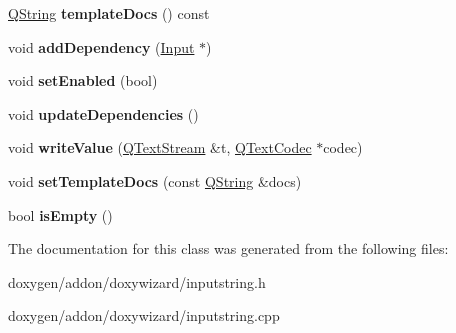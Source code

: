 \begin{DoxyCompactItemize}
\mbox{\hyperlink{class_q_string}{Q\+String}} {\bfseries template\+Docs} () const
\item 
\mbox{\label{class_input_string_a46b5ce5badcf1c6df3a891810cb91e41}} 
void {\bfseries add\+Dependency} (\mbox{\hyperlink{class_input}{Input}} $\ast$)
\item 
\mbox{\label{class_input_string_add9620f611a4e69090232a7b15c7e74e}} 
void {\bfseries set\+Enabled} (bool)
\item 
\mbox{\label{class_input_string_afc5b4853b2226058f4b996c114967f81}} 
void {\bfseries update\+Dependencies} ()
\item 
\mbox{\label{class_input_string_ae515cffbe50507d2c97ffa3ea36cade0}} 
void {\bfseries write\+Value} (\mbox{\hyperlink{class_q_text_stream}{Q\+Text\+Stream}} \&t, \mbox{\hyperlink{class_q_text_codec}{Q\+Text\+Codec}} $\ast$codec)
\item 
\mbox{\label{class_input_string_af6b070828f85757ca6cf565288ab1dd1}} 
void {\bfseries set\+Template\+Docs} (const \mbox{\hyperlink{class_q_string}{Q\+String}} \&docs)
\item 
\mbox{\label{class_input_string_acba78bfffcdd66d9b0c49291a0511f49}} 
bool {\bfseries is\+Empty} ()
\end{DoxyCompactItemize}


The documentation for this class was generated from the following files\+:\begin{DoxyCompactItemize}
\item 
doxygen/addon/doxywizard/inputstring.\+h\item 
doxygen/addon/doxywizard/inputstring.\+cpp\end{DoxyCompactItemize}
